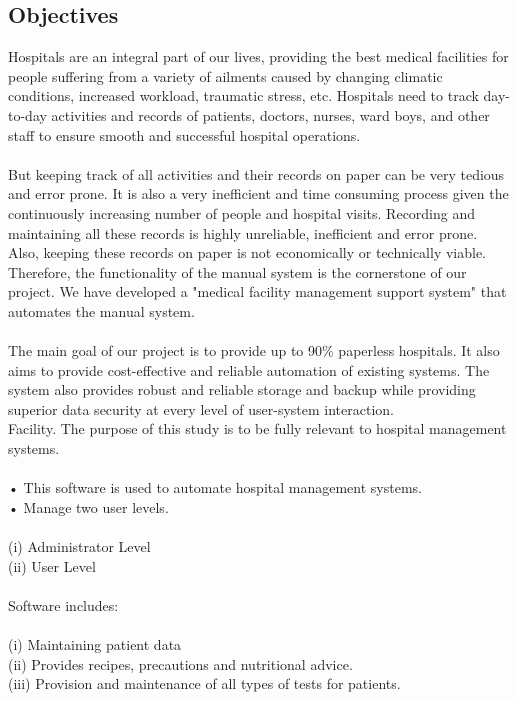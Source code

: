 \documentclass{article}
\begin{document}
\subsection{Objectives}
Hospitals are an integral part of our lives, providing the best medical facilities for people suffering from a variety of ailments caused by changing climatic conditions, increased workload, traumatic stress, etc. Hospitals need to track day-to-day activities and records of patients, doctors, nurses, ward boys, and other staff to ensure smooth and successful hospital operations.\\\\
But keeping track of all activities and their records on paper can be very tedious and error prone. It is also a very inefficient and time consuming process given the continuously increasing number of people and hospital visits. Recording and maintaining all these records is highly unreliable, inefficient and error prone. Also, keeping these records on paper is not economically or technically viable. Therefore, the functionality of the manual system is the cornerstone of our project. We have developed a "medical facility management support system" that automates the manual system.\\\\
The main goal of our project is to provide up to 90\% paperless hospitals. It also aims to provide cost-effective and reliable automation of existing systems. The system also provides robust and reliable storage and backup while providing superior data security at every level of user-system interaction.\\
Facility.
The purpose of this study is to be fully relevant to hospital management systems.\\\\
• This software is used to automate hospital management systems.\\
• Manage two user levels.\\\\
(i)	 Administrator Level\\
(ii)	User Level\\\\

Software includes:\\\\
(i)	Maintaining patient data\\
(ii)	Provides recipes, precautions and nutritional advice.\\
(iii)	Provision and maintenance of all types of tests for patients.
\newpage
\end{document}

